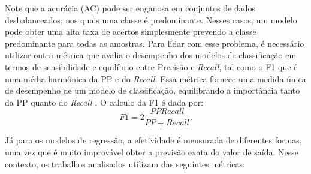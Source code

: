 Note que a acurácia (AC) pode ser enganosa em conjuntos de dados desbalanceados, nos quais uma classe é predominante. Nesses casos, um modelo pode obter uma alta taxa de acertos simplesmente prevendo a classe predominante para todas as amostras. Para lidar com esse problema, é necessário utilizar outra métrica que avalia o desempenho dos modelos de classificação em termos de sensibilidade e equilíbrio entre Precisão e \textit{Recall}, tal como o \ac{F1} que é uma média harmônica da \ac{PP} e do \textit{Recall}. Essa métrica fornece uma medida única de desempenho de um modelo de classificação, equilibrando a importância tanto da \ac{PP} quanto do \textit{Recall} \cite{jiang2020improved}. O calculo da \ac{F1} é dada por: 
\begin{equation}
  \label{eq:F1}
  F1 = 2 \frac{PP  \textit{Recall}}{PP + \textit{Recall}}.
\end{equation}

Já para os modelos de regressão, a efetividade é mensurada de diferentes formas, uma vez que é muito improvável obter a previsão exata do valor de saída. Nesse contexto, os trabalhos analisados utilizam das seguintes métricas: 

